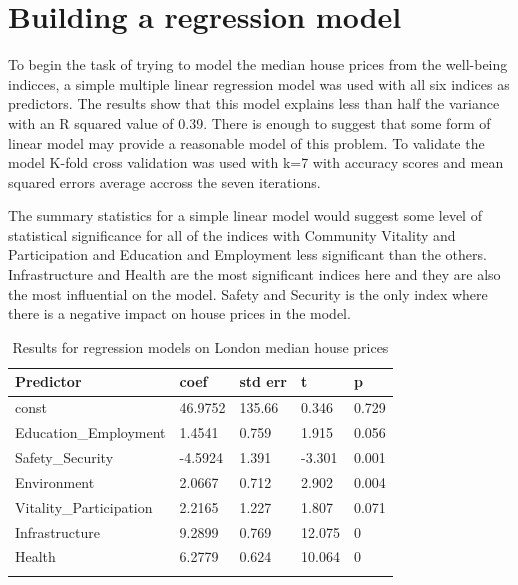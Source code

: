 
\section{Building a regression model}

To begin the task of trying to model the median house prices from the well-being indicces, a simple multiple linear regression model was used with all six indices as predictors. The results show that this model explains less than half the variance with an R squared value of 0.39. There is enough to suggest that some form of linear model may provide a reasonable model of this problem.
To validate the model K-fold cross validation was used with k=7 with accuracy scores and mean squared errors average accross the seven iterations.

The summary statistics for a simple linear model would suggest some level of statistical significance for all of the indices with Community Vitality and Participation and Education and Employment less significant than the others. Infrastructure and Health are the most significant indices here and they are also the most influential on the model. Safety and Security is the only index where there is a negative impact on house prices in the model. 

\begin{table}[H]
\caption{Results for regression models on London median house prices}
\centering
\begin{tabular}{lllll}
\toprule
Predictor               & coef    & std err & t      & p     \\
\midrule
const                   & 46.9752 & 135.66  & 0.346  & 0.729 \\
Education\_Employment   & 1.4541  & 0.759   & 1.915  & 0.056 \\
Safety\_Security        & -4.5924 & 1.391   & -3.301 & 0.001 \\
Environment             & 2.0667  & 0.712   & 2.902  & 0.004 \\
Vitality\_Participation & 2.2165  & 1.227   & 1.807  & 0.071 \\
Infrastructure          & 9.2899  & 0.769   & 12.075 & 0     \\
Health                  & 6.2779  & 0.624   & 10.064 & 0  \\
\bottomrule\\  
\end{tabular}
\end{table}

